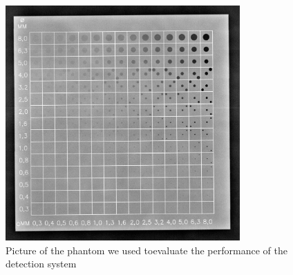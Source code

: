 \documentclass[a4paper]{article}
\begin{document}
\begin{figure}[h]
	\centering
	\includegraphics[width=0.8\textwidth]{./immagini_terza_prova/ex4/CDRAD-10_3.jpg}
	\caption{Picture of the phantom we used toevaluate the performance of the detection system}
  \label{fig:phantom}
\end{figure}

\clearpage
\end{document}
